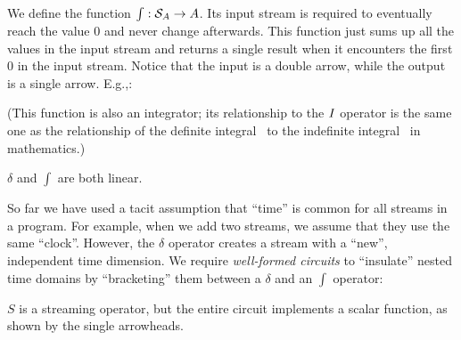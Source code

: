 
We define the function $\int : \mathcal{S}_{A} \rightarrow A$.  Its input
stream is required to eventually reach the value 0 and never change
afterwards.  This function just sums up all the values in the input
stream and returns a single result when it encounters the first 0 in
the input stream.  Notice that the input is a double arrow, while the
output is a single arrow.  E.g.,:

\begin{center}
\end{center}
%
\noindent (This function is also an integrator; its relationship to
the $\mathit{I}$ operator is the same one as the relationship of the definite
integral~\cite{integral} to the indefinite
integral~\cite{antiderivative} in mathematics.)

$\delta$ and $\int$ are both linear.



So far we have used a tacit assumption that ``time'' is common for all
streams in a program.  For example, when we add two streams, we assume
that they use the same ``clock''.  However, the $\delta$ operator
creates a stream with a ``new'', independent time dimension.  We
require \emph{well-formed circuits} to ``insulate'' nested time
domains by ``bracketing'' them between a $\delta$ and an $\int$
operator:
%
\begin{center}
\end{center}
\vspace{-1ex}
$S$ is a streaming operator, but the entire circuit implements a
scalar function, as shown by the single arrowheads.

